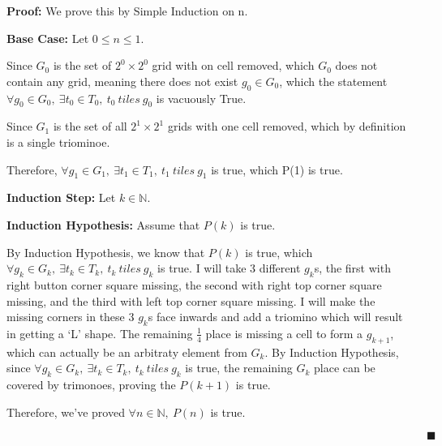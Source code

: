 \documentclass[12pt]{article}
\begin{document}
\begin{enumerate}[label=(\alph*)]
    \textbf{Proof:} We prove this by Simple Induction on n.


    \textbf{Base Case:} Let $0 \leq n \leq 1$.

    Since $G_0$ is the set of $2^0 \times 2^0$ grid with on cell removed, which $G_0$ does not contain any grid, meaning there does not exist $g_0 \in G_0$, which the statement $\forall g_0 \in G_0,\ \exists t_0 \in T_0,\ t_0\ tiles\ g_0$ is vacuously True.

    Since $G_1$ is the set of all $2^1 \times 2^1$ grids with one cell removed, which by definition is a single triominoe.
    
    Therefore, $\forall g_1 \in G_1,\ \exists t_1 \in T_1,\ t_1\ tiles\ g_1$ is true, which P(1) is true.

    \textbf{Induction Step:} Let $k \in \mathbb{N}$.
    
    \textbf{Induction Hypothesis:} Assume that $P(k)$ is true.

    By Induction Hypothesis, we know that $P(k)$ is true, which $\forall g_k \in G_k,\ \exists t_k \in T_k,\ t_k\ tiles\ g_k $ is true.
    I will take 3 different $g_k$s, the first with right button corner square missing, the second with right top corner square missing, and the third with left top corner square missing.
    I will make the missing corners in these 3 $g_k$s face inwards and add a triomino which will result in getting a `L' shape.
    The remaining $\frac{1}{4}$ place is missing a cell to form a $g_{k+1}$, which can actually be an arbitraty element from $G_k$.
    By Induction Hypothesis, since $\forall g_k \in G_k,\ \exists t_k \in T_k,\ t_k\ tiles\ g_k $ is true, the remaining $G_k$ place can be covered by trimonoes, proving the $P(k+1)$ is true.

    Therefore, we've proved $\forall n \in \mathbb{N},\ P(n)$ is true. 

    $\quad \quad \quad \quad \quad \quad \quad \quad \quad \quad \quad \quad \quad \quad \quad \quad \quad \quad \quad \quad \quad \quad \quad \quad \quad \quad \quad \quad \quad \quad \quad \quad \quad \quad \quad \quad \quad \blacksquare $
\end{enumerate}


\end{document}
